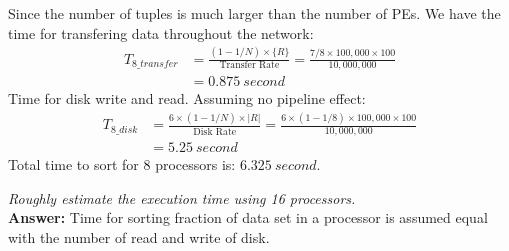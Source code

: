 \documentclass[a4paper,12pt]{article}
\begin{document}
\noindent
Since the number of tuples is much larger than the number of PEs. We have the time for transfering data throughout the network:
\begin{equation*}
	\begin{aligned}
		T_{8\_transfer} & = \frac{(1-1/N) \times \{R\}}{\mbox{Transfer Rate}}
		 = \frac{7/8 \times 100,000 \times 100}{10,000,000} \\
		& = 0.875\ second
	\end{aligned}
\end{equation*}
Time for disk write and read. Assuming no pipeline effect:
\begin{equation*}
	\begin{aligned}
		 T_{8\_disk} & = \frac{6 \times (1 - 1/N) \times |R|}{\mbox{Disk Rate}}
					  = \frac{6 \times (1 - 1/8) \times 100,000 \times 100}{10,000,000} \\
					 & = 5.25\ second
	\end{aligned}
\end{equation*}
Total time to sort for 8 processors is: $6.325\ second$.

\vspace{1.5em}

\textit{Roughly estimate the execution time using 16 processors.} \\

\noindent
\textbf{Answer:} 
\noindent
Time for sorting fraction of data set in a processor is assumed equal with the number of read and write of disk.
\end{document}
